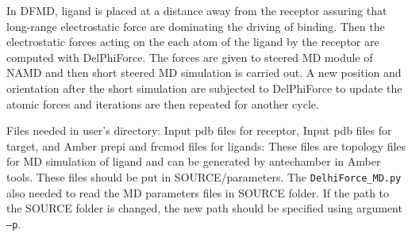 \documentclass[9pt,tutorial,pubversion]{livecoms}
\begin{document}
In DFMD, ligand is placed at a distance away from the receptor assuring that long-range electrostatic force are dominating the driving of binding. Then the electrostatic forces acting on the each atom of the ligand by the receptor are computed with DelPhiForce\cite{li2017delphiforce}. The forces are given to steered MD module of NAMD and then short steered MD simulation is carried out. A new position and orientation after the short simulation are subjected to DelPhiForce to update the atomic forces and iterations are then repeated for another cycle.

Files needed in user’s directory:
Input pdb files for receptor, Input pdb files for target, and Amber prepi and frcmod files for ligands: These files are topology files for MD simulation of ligand and can be generated by antechamber in Amber tools. These files should be put in SOURCE/parameters. The \texttt{DelhiForce\_MD.py} also needed to read the MD parameters files in SOURCE folder. If the path to the SOURCE folder is changed, the new path should be specified using argument \texttt{–p}.
\end{document}
